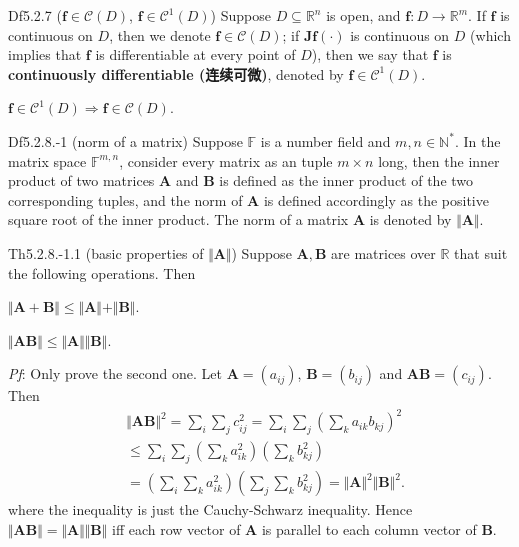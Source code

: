 \documentclass{article}
\begin{document}
\begin{Df}{Df5.2.7 ($\pmb{f}\in\mathcal{C}(D)$, $\pmb{f}\in\mathcal{C}^1(D)$)}
    Suppose $D\subseteq\mathbb{R}^n$ is open, and $\pmb{f}: D\rightarrow\mathbb{R}^m$. If $\pmb{f}$ is continuous on $D$, then we denote $\pmb{f}\in\mathcal{C}(D)$; if $\pmb{Jf}(\cdot)$ is continuous on $D$ \textcolor{Th}{(which implies that $\pmb{f}$ is differentiable at every point of $D$)}, then we say that $\pmb{f}$ is \textbf{continuously differentiable (连续可微)}, denoted by $\pmb{f}\in\mathcal{C}^1(D)$.
\end{Df}

\begin{Rmk}{}
    \textcolor{Th}{$\pmb{f}\in\mathcal{C}^1(D) \Rightarrow \pmb{f}\in\mathcal{C}(D)$.}
\end{Rmk}

\begin{Df}{Df5.2.8.-1 (norm of a matrix)}
    Suppose $\mathbb{F}$ is a number field and $m, n\in\mathbb{N}^\ast$. In the matrix space $\mathbb{F}^{m,n}$, consider every matrix as an tuple $m\times n$ long, then the inner product of two matrices $\pmb{A}$ and $\pmb{B}$ is defined as the inner product of the two corresponding tuples, and the norm of $\pmb{A}$ is defined accordingly as the positive square root of the inner product. The norm of a matrix $\pmb{A}$ is denoted by $\Vert \pmb{A}\Vert$.
\end{Df}

\begin{Th}{Th5.2.8.-1.1 (basic properties of $\Vert\pmb{A}\Vert$)}
    Suppose $\pmb{A}, \pmb{B}$ are matrices over $\mathbb{R}$ that suit the following operations. Then
    \begin{compactenum}
        \item $\Vert \pmb{A} + \pmb{B}\Vert \leq \Vert \pmb{A}\Vert + \Vert \pmb{B}\Vert$.
        \item $\Vert \pmb{A}\pmb{B}\Vert \leq \Vert \pmb{A}\Vert\Vert \pmb{B}\Vert$.
    \end{compactenum}
    \tcblower
    \textit{Pf}: Only prove the second one. Let $\pmb{A} = (a_{ij})$, $\pmb{B} = (b_{ij})$ and $\pmb{AB} = (c_{ij})$. Then
    $$ 
    \begin{aligned}
        & \Vert \pmb{AB}\Vert^2 = \sum_i\sum_j c_{ij}^2 = \sum_i\sum_j\left(\sum_k a_{ik}b_{kj}\right)^2 \\
        & \leq \sum_i\sum_j\left(\sum_k a_{ik}^2\right)\left(\sum_k b_{kj}^2\right) \\
        & = \left( \sum_i\sum_k a_{ik}^2 \right)\left( \sum_j\sum_k b_{kj}^2 \right) = \Vert \pmb{A}\Vert^2\Vert \pmb{B}\Vert^2.
    \end{aligned}
    $$
    where the inequality is just the Cauchy-Schwarz inequality. Hence \textcolor{Th}{$\Vert \pmb{AB}\Vert = \Vert \pmb{A}\Vert\Vert \pmb{B}\Vert$ iff each row vector of $\pmb{A}$ is parallel to each column vector of $\pmb{B}$.}
\end{Th}
\end{document}
